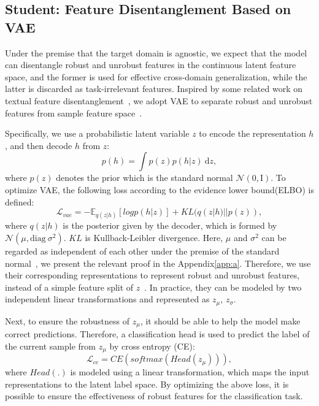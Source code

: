 \documentclass[letterpaper]{article} %
\begin{document}
\subsection{Student: Feature Disentanglement Based on VAE}
Under the premise that the target domain is agnostic, we expect that the model can disentangle robust and unrobust features in the continuous latent feature space, and the former is used for effective cross-domain generalization, while the latter is discarded as task-irrelevant features. Inspired by some related work on textual feature disentanglement~\cite{BaoZHLMVDC19, JohnMBV19}, we adopt VAE to separate robust and unrobust features from sample feature space~\cite{KingmaW13}.

Specifically, we use a probabilistic latent variable $z$ to encode the representation $h$, and then decode $h$ from $z$:
\begin{equation}
	p(h) = \int p(z)p(h|z)~\mathrm{d}z,
\end{equation}
where $p(z)$ denotes the prior which is the standard normal $\mathcal{N}(0, \mathrm{I})$. To optimize VAE, the following loss according to the evidence lower bound(ELBO) is defined:
\begin{equation}
	\mathcal{L}_{vae} = -\mathbb{E}_{q(z|h)}[logp(h|z)] + KL(q(z|h)||p(z)),
\end{equation}
where $q(z|h)$ is the posterior given by the decoder, which is formed by $\mathcal{N}(\mu, \mathrm{diag}~\sigma^2)$. $KL$ is Kullback-Leibler divergence. Here, $\mu$ and $\sigma^2$ can be regarded as independent of each other under the premise of the standard normal~\cite{kawata1949characterisation,Fotopoulos07}, we present the relevant proof in the Appendix\ref{app:a}. Therefore, we use their corresponding representations to represent robust and unrobust features, instead of a simple feature split of $z$~\cite{JohnMBV19}. In practice, they can be modeled by two independent linear transformations and represented as $z_{\mu}$, $z_{\sigma}$.

Next, to ensure the robustness of $z_{\mu}$, it should be able to help the model make correct predictions. Therefore, a classification head is used to predict the label of the current sample from $z_{\mu}$ by cross entropy (CE):
\begin{equation}
	\mathcal{L}_{ce} = CE(softmax(Head(z_{\mu}))),
\end{equation}
where $Head(.)$ is modeled using a linear transformation, which maps the input representations to the latent label space. By optimizing the above loss, it is possible to ensure the effectiveness of robust features for the classification task.
\end{document}
